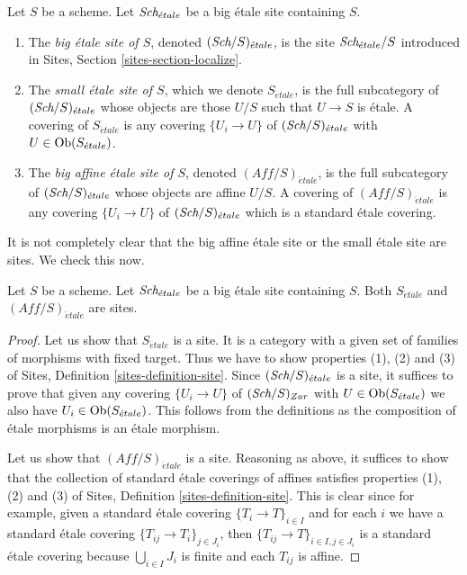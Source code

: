 \begin{definition}
\label{definition-big-small-etale}
Let $S$ be a scheme. Let $\textit{Sch}_{\acute{e}tale}$ be a big \'etale
site containing $S$.
\begin{enumerate}
\item The {\it big \'etale site of $S$}, denoted
$(\textit{Sch}/S)_{\acute{e}tale}$, is the site
$\textit{Sch}_{\acute{e}tale}/S$ introduced in
Sites, Section \ref{sites-section-localize}.
\item The {\it small \'etale site of $S$}, which we denote
$S_{\acute{e}tale}$, is the full subcategory of
$(\textit{Sch}/S)_{\acute{e}tale}$
whose objects are those $U/S$ such that $U \to S$ is \'etale.
A covering of $S_{\acute{e}tale}$ is any covering $\{U_i \to U\}$ of
$(\textit{Sch}/S)_{\acute{e}tale}$ with $U \in \mathop{\rm Ob}\nolimits(S_{\acute{e}tale})$.
\item The {\it big affine \'etale site of $S$}, denoted
$(\textit{Aff}/S)_{\acute{e}tale}$, is the full subcategory of
$(\textit{Sch}/S)_{\acute{e}tale}$ whose objects are affine $U/S$.
A covering of $(\textit{Aff}/S)_{\acute{e}tale}$ is any covering
$\{U_i \to U\}$ of $(\textit{Sch}/S)_{\acute{e}tale}$ which is a
standard \'etale covering.
\end{enumerate}
\end{definition}

\noindent
It is not completely clear that
the big affine \'etale site or the small \'etale site are sites.
We check this now.

\begin{lemma}
\label{lemma-verify-site-etale}
Let $S$ be a scheme. Let $\textit{Sch}_{\acute{e}tale}$ be a big \'etale
site containing $S$.
Both $S_{\acute{e}tale}$ and $(\textit{Aff}/S)_{\acute{e}tale}$ are sites.
\end{lemma}

\begin{proof}
Let us show that $S_{\acute{e}tale}$ is a site. It is a category with a
given set of families of morphisms with fixed target. Thus we
have to show properties (1), (2) and (3) of
Sites, Definition \ref{sites-definition-site}.
Since $(\textit{Sch}/S)_{\acute{e}tale}$ is a site, it suffices to prove
that given any covering $\{U_i \to U\}$ of $(\textit{Sch}/S)_{Zar}$
with $U \in \mathop{\rm Ob}\nolimits(S_{\acute{e}tale})$ we also have
$U_i \in \mathop{\rm Ob}\nolimits(S_{\acute{e}tale})$.
This follows from the definitions as the composition of \'etale morphisms
is an \'etale morphism.

\medskip\noindent
Let us show that $(\textit{Aff}/S)_{\acute{e}tale}$ is a site.
Reasoning as above, it suffices to show that the collection
of standard \'etale coverings of affines satisfies properties
(1), (2) and (3) of
Sites, Definition \ref{sites-definition-site}.
This is clear since for example, given a standard \'etale
covering $\{T_i \to T\}_{i\in I}$ and for each
$i$ we have a standard \'etale covering $\{T_{ij} \to T_i\}_{j\in J_i}$, then
$\{T_{ij} \to T\}_{i \in I, j\in J_i}$ is a standard \'etale covering
because $\bigcup_{i\in I} J_i$ is finite and each $T_{ij}$ is affine.
\end{proof}


